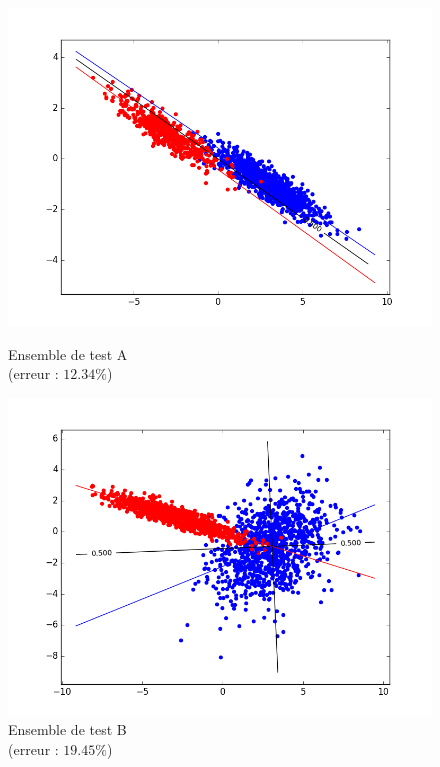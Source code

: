 \documentclass[paper=a4, fontsize=11pt]{article}
\begin{document}
\begin{figure}[h]
 \begin{minipage}[b]{.3\linewidth}
 \begin{center}
 \includegraphics[scale=0.25]{figures/lin_reg_A_test.png}
  \caption*{Ensemble de test A \\ (erreur : $12.34\%$)}
 \end{center}
 \end{minipage} \hfill
 \begin{minipage}[b]{.3\linewidth}
  \includegraphics[scale=0.25]{figures/lin_reg_B_test.png}
  \caption*{Ensemble de test B \\ (erreur : $19.45\%$)}
 \end{minipage} \hfill

\end{figure}
\end{document}
